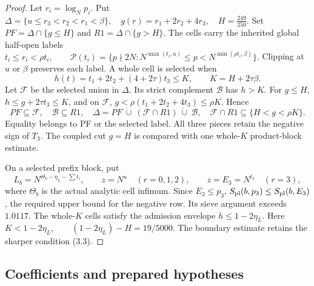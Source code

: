 \begin{proof}
Let $r_i=\log_Np_i$. Put
$\Delta=\{u\le r_3<r_2<r_1<\beta\},\quad
 g(r)=r_1+2r_2+4r_3,\quad H=\frac{249}{250}.$
Set $PF=\Delta\cap\{g\le H\}$ and $R1=\Delta\cap\{g>H\}$.
The cells carry the inherited global half-open labels
$t_i\le r_i<\rho t_i,\qquad
 \mathcal P(t_i)=\{p\nmid2N:N^{\max(t_i,u)}\le p<N^{\min(\rho t_i,\beta)}\}.$
Clipping at $u$ or $\beta$ preserves each label.
A whole cell is selected when
\[
 h(t)=t_1+2t_2+(4+2\tau)t_3\le K,
 \qquad K=H+2\tau\beta.
 \tag{3.3}
\]
Let $\mathcal F$ be the selected union in $\Delta$.
Its strict complement $\mathcal B$ has $h>K$.
For $g\le H$, $h\le g+2\tau t_3\le K$,
and on $\mathcal F$, $g<\rho(t_1+2t_2+4t_3)\le\rho K$. Hence
\[
 PF\subseteq\mathcal F,\quad\mathcal B\subseteq R1,\quad
 \Delta=PF\ \dot\cup\ (\mathcal F\cap R1)\ \dot\cup\ \mathcal B,
 \quad \mathcal F\cap R1\subseteq\{H<g<\rho K\}.
 \tag{3.4}
\]
Equality belongs to PF or the selected label.
All three pieces retain the negative sign of $T_3$.
The coupled cut $g=H$ is compared with one whole-$K$ product-block estimate.

On a selected prefix block, put
\[
 L_b=N^{\Theta_b-\eta_L-\sum t_i},\qquad
 z=N^u\quad(r=0,1,2),\qquad z=E_3=N^{t_3}\quad(r=3),
 \tag{3.5}
\]
where $\Theta_b$ is the actual analytic cell infimum.
Since $E_3\le p_3$,
$S_{\rm pl}(b,p_3)\le S_{\rm pl}(b,E_3)$, the required upper bound for the negative row.
Its sieve argument exceeds $1.0117$.
The whole-$K$ cells satisfy the admission envelope $h\le1-2\eta_L$.
Here $K<1-2\eta_L,\qquad (1-2\eta_L)-H=19/5000.$
The boundary estimate retains the sharper condition (3.3).
\end{proof}

\subsection{Coefficients and prepared hypotheses}
\label{sec:s2-3}

